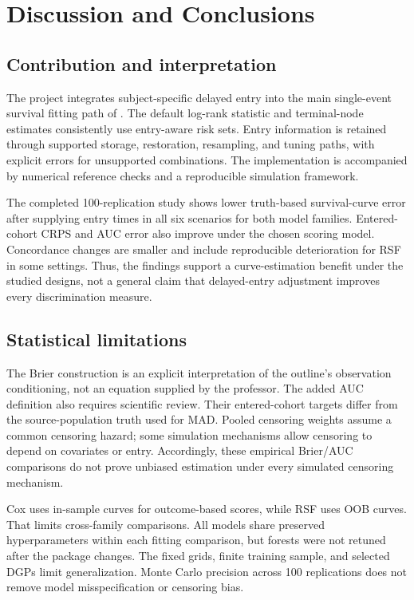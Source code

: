 \chapter{Discussion and Conclusions}
\section{Contribution and interpretation}
The project integrates subject-specific delayed entry into the main
single-event survival fitting path of \pkg{}. The default log-rank
statistic and terminal-node estimates consistently use entry-aware risk
sets. Entry information is retained through supported storage, restoration,
resampling, and tuning paths, with explicit errors for unsupported
combinations. The implementation is accompanied by numerical reference
checks and a reproducible simulation framework.

The completed 100-replication study shows lower truth-based survival-curve
error after supplying entry times in all six scenarios for both model
families. Entered-cohort CRPS and AUC error also improve under the chosen
scoring model. Concordance changes are smaller and include reproducible
deterioration for RSF in some settings. Thus, the findings support a
curve-estimation benefit under the studied designs, not a general claim
that delayed-entry adjustment improves every discrimination measure.

\section{Statistical limitations}
The Brier construction is an explicit interpretation of the outline's
observation conditioning, not an equation supplied by the professor.
The added AUC definition also requires scientific review. Their
entered-cohort targets differ from the source-population truth used for
MAD. Pooled censoring weights assume a common censoring hazard; some
simulation mechanisms allow censoring to depend on covariates or entry.
Accordingly, these empirical Brier/AUC comparisons do not prove unbiased
estimation under every simulated censoring mechanism.

Cox uses in-sample curves for outcome-based scores, while RSF uses OOB
curves. That limits cross-family comparisons. All models share preserved
hyperparameters within each fitting comparison, but forests were not
retuned after the package changes. The fixed grids, finite training sample,
and selected DGPs limit generalization. Monte Carlo precision across
100 replications does not remove model misspecification or censoring bias.

